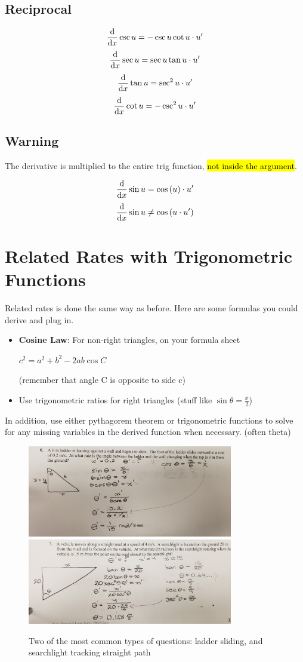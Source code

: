 \documentclass[a4paper,12pt]{article}
\begin{document}
\subsection{Reciprocal}
$$\dv{}{x} \csc{u} = -\csc{u}\cot{u} \cdot u'$$
$$\dv{}{x} \sec{u} = \sec{u}\tan{u} \cdot u'$$
$$\dv{}{x} \tan{u} = \sec^2{u} \cdot u'$$
$$\dv{}{x} \cot{u} = -\csc^2{u} \cdot u'$$

\subsection{Warning}
The derivative is multiplied to the entire trig function, \hl{not inside the argument}.

$$\dv{}{x} \sin{u} = \cos{(u)} \cdot u'$$
$$\dv{}{x} \sin{u} \neq \cos{(u \cdot u')}$$

\section{Related Rates with Trigonometric Functions}
Related rates is done the same way as before. Here are some formulas you could derive and plug in.

\begin{itemize}
    \item{
        \textbf{Cosine Law}: For non-right triangles, on your formula sheet

        $c^2 = a^2 + b^2 - 2ab\cos{C}$

        (remember that angle C is opposite to side c)
    }
\item{Use trigonometric ratios for right triangles (stuff like $\sin{\theta} = \frac{x}{2}$)}
\end{itemize}

In addition, use either pythagorem theorem or trigonometric functions to solve for any missing variables in the derived function when necessary. (often theta)

\begin{figure}[H]
    \centering
    \includegraphics[width=0.8\textwidth]{ladder}
    \includegraphics[width=0.8\textwidth]{light}
    \caption{Two of the most common types of questions: ladder sliding, and searchlight tracking straight path}
\end{figure}
\end{document}
